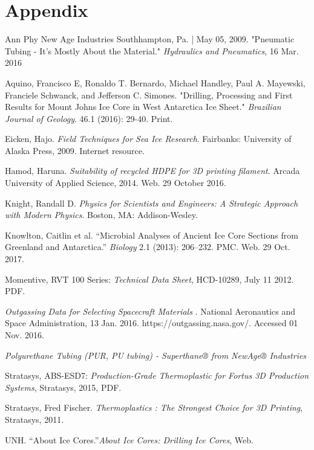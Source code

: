 \documentclass{article}
\begin{document}
\section{Appendix}
\begin{thebibliography}{12}
Ann Phy New Age Industries Southhampton, Pa. | May 05, 2009. "Pneumatic Tubing - It's Mostly About the Material." \textit{Hydraulics and Pneumatics}, 16 Mar. 2016

Aquino, Francisco E, Ronaldo T. Bernardo, Michael Handley, Paul A. Mayewski, Franciele Schwanck, and Jefferson C. Simones. "Drilling, Processing and First Results for Mount Johns Ice Core in West Antarctica Ice Sheet." \textit{Brazilian Journal of Geology}. 46.1 (2016): 29-40. Print.

Eicken, Hajo. \textit{Field Techniques for Sea Ice Research}. Fairbanks: University of Alaska Press, 2009. Internet resource.

Hamod, Haruna. \textit{Suitability of recycled HDPE for 3D printing filament}. Arcada University of Applied Science, 2014. Web. 29 October 2016.

Knight, Randall D. \textit{Physics for Scientists and Engineers: A Strategic Approach with Modern Physics}. Boston, MA: Addison-Wesley.

Knowlton, Caitlin et al. “Microbial Analyses of Ancient Ice Core Sections from Greenland and Antarctica.” \textit{Biology} 2.1 (2013): 206–232. PMC. Web. 29 Oct. 2017.

Momentive, RVT 100 Series: \textit{Technical Data Sheet}, HCD-10289, July 11 2012. PDF.

\textit{Outgassing Data for Selecting Spacecraft Materials} . National Aeronautics and Space Administration, 13 Jan. 2016. https://outgassing.nasa.gov/. Accessed 01 Nov. 2016.

\textit{Polyurethane Tubing (PUR, PU tubing) - Superthane® from NewAge® Industries}

Stratasys, ABS-ESD7: \textit{Production-Grade Thermoplastic for Fortus 3D Production Systems}, Stratasys, 2015, PDF.

Stratasys, Fred Fischer. \textit{Thermoplastics : The Strongest Choice for 3D Printing}, Stratasys, 2011.

UNH. “About Ice Cores.”\textit{About Ice Cores: Drilling Ice Cores}, Web.

\end{thebibliography}
\end{document}
